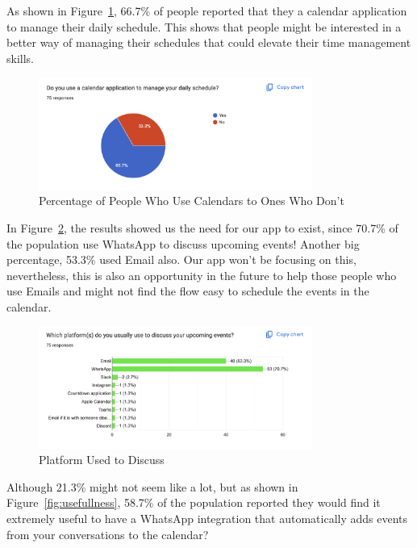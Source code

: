 \documentclass[12pt,a4paper]{report}
\begin{document}
As shown in Figure~\ref{fig:use-calendar}, 66.7\% of people reported that they a calendar application to manage their daily schedule. This shows that people might be interested in a better way of managing their schedules that could elevate their time management skills.

\begin{figure}[!h]
    \centering
    \includegraphics[width=0.8\textwidth]{images/survey/use-calendar.png}
    \caption{Percentage of People Who Use Calendars to Ones Who Don't}
    \label{fig:use-calendar}
\end{figure}

In Figure~\ref{fig:platform-to-discuss}, the results showed us the need for our app to exist, since 70.7\% of the population use WhatsApp to discuss upcoming events! Another big percentage, 53.3\% used Email also. Our app won't be focusing on this, nevertheless, this is also an opportunity in the future to help those people who use Emails and might not find the flow easy to schedule the events in the calendar.

\begin{figure}[!h]
    \centering
    \includegraphics[width=0.8\textwidth]{images/survey/platform-to-discuss.png}
    \caption{Platform Used to Discuss}
    \label{fig:platform-to-discuss}
\end{figure}

Although 21.3\% might not seem like a lot, but as shown in Figure~\ref{fig:usefullness}, 58.7\% of the population reported they would find it extremely useful to have a WhatsApp integration that automatically adds events from your conversations to the calendar?
\end{document}
